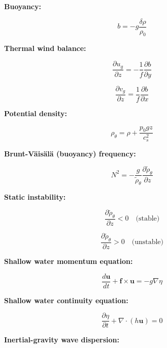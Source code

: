 \documentclass[12pt]{article}
\numberwithin{equation}{section}
\numberwithin{figure}{section}
\numberwithin{table}{section}
\begin{document}
\textbf{Buoyancy:}

\begin{equation}
  b = - g \frac{\delta \rho}{\rho_0}
\end{equation}

\textbf{Thermal wind balance:}

\begin{equation}
  \frac{\partial u_g}{\partial z} = - \frac{1}{f} \frac{\partial b}{\partial y}
\end{equation}

\begin{equation}
  \frac{\partial v_g}{\partial z} = \frac{1}{f} \frac{\partial b}{\partial x}
\end{equation}

\textbf{Potential density:}

\begin{equation}
  \rho_\theta = \rho + \frac{p_0 g z}{c_s^2}
\end{equation}

\textbf{Brunt-Väisälä (buoyancy) frequency:}

\begin{equation}
  N^2 = - \frac{g}{\widetilde{\rho}_\theta} \frac{\partial \widetilde{\rho}_\theta}{\partial z}
\end{equation}

\textbf{Static instability:}

\begin{equation}
  \frac{\partial \widetilde{\rho}_\theta}{\partial z} < 0 \quad \text{(stable)}
\end{equation}

\begin{equation}
  \frac{\partial \widetilde{\rho}_\theta}{\partial z} > 0 \quad \text{(unstable)}
\end{equation}

\textbf{Shallow water momentum equation:}

\begin{equation}
  \frac{d \mathbf{u}}{dt} + \mathbf{f} \times \mathbf{u} = - g \nabla \eta
\end{equation}

\textbf{Shallow water continuity equation:}

\begin{equation}
  \frac{\partial \eta}{\partial t} + \nabla \cdot (h \mathbf{u}) = 0
\end{equation}

\textbf{Inertial-gravity wave dispersion:}
\end{document}
